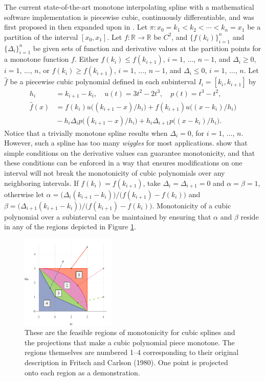 \documentclass{scspaperproc}
\theoremstyle{scsthe}
\begin{document}
The current state-of-the-art monotone interpolating spline with a mathematical software implementation is piecewise cubic, continuously differentiable, and was first proposed in \cite{fritsch1980monotone} then expanded upon in \cite{carlson1985monotone}. Let $\pi: x_0 = k_1 < k_2 < \cdots < k_n = x_1$ be a partition of the interval $[x_0,x_1]$. Let $f: \mathbb{R} \rightarrow \mathbb{R}$ be $C^2$, and $\bigl\{f(k_i)\bigr\}_{i=1}^n$ and $\bigl\{\Delta_i\bigr\}_{i=1}^n$ be given sets of function and derivative values at the partition points for a monotone function $f$. Either $f(k_i) \leq f(k_{i+1})$, $i=1$, $\ldots$, $n-1$, and $\Delta_i\ge0$, $i=1$, $\ldots$, $n$, or $f(k_i) \geq f(k_{i+1})$, $i=1$, $\ldots$, $n-1$, and $\Delta_i\le0$, $i=1$, $\ldots$, $n$. Let $\hat f$ be a piecewise cubic polynomial defined in each subinterval $I_i = [k_i, k_{i+1}]$ by
\begin{align*}
h_i &= k_{i+1} - k_{i}, \quad
u(t) = 3t^2 - 2t^3, \quad
p(t) = t^3 - t^2,\\
\hat f(x) &= f(k_i) u\big((k_{i+1} - x) / h_i\big) +
f(k_{i+1}) u\big((x - k_i) / h_i\big) \\
&{} - h_i\Delta_i p\big((k_{i+1}-x)/h_i\big) + h_i\Delta_{i+1}
p\big((x-k_i)/h_i\big).
\end{align*}
Notice that a trivially monotone spline results when $\Delta_i = 0$, for $i = 1$, $\ldots$, $n$. However, such a spline has too many \textit{wiggles} for most applications.  show that simple conditions on the derivative values can guarantee monotonicity, and that these conditions can be enforced in a way that ensures modifications on one interval will not break the monotonicity of cubic polynomials over any neighboring intervals. If $f(k_i) = f(k_{i+1})$, take $\Delta_i = \Delta_{i+1} =0$ and $\alpha =\beta =1$, otherwise let $\alpha = \big(\Delta_i (k_{i+1}-k_i)\big) / \big(f(k_{i+1}) - f(k_i)\big)$ and $\beta = \big(\Delta_{i+1}(k_{i+1}-k_i)\big) / \big(f(k_{i+1}) - f(k_i)\big)$. Monotonicity of a cubic polynomial over a subinterval can be maintained by ensuring that $\alpha$ and $\beta$ reside in any of the regions depicted in Figure \ref{fig:projection}.

\begin{figure}
  \centering
  \includegraphics[width=0.40\textwidth]{cubic_projection_demonstration}
  \caption{These are the feasible regions of monotonicity for cubic splines and the projections that make a cubic polynomial piece monotone. The regions themselves are numbered 1--4 corresponding to their original description in Fritsch and Carlson (1980). One point is projected onto each region as a demonstration.}\label{fig:projection}
\end{figure}
\end{document}
